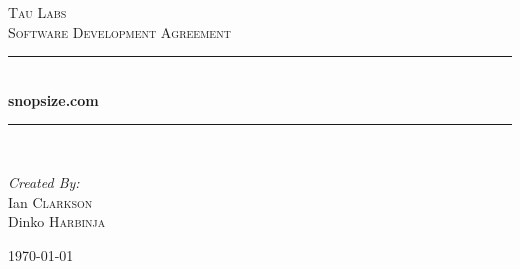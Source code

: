 \begin{titlepage}

\newcommand{\HRule}{\rule{\linewidth}{0.5mm}}

\begin{center}


\textsc{\LARGE Tau Labs}\\[1.5cm]

\textsc{\Large Software Development Agreement}\\[1.5cm]

\HRule \\[0.4cm]
{ \huge \bf snopsize.com}\\[0.4cm]
\HRule \\[1.5cm]

\begin{minipage}{0.4\textwidth}
\begin{flushleft} \large
\emph{Created By:}\\
Ian \textsc{Clarkson} \\
Dinko \textsc{Harbinja} 
\end{flushleft}
\end{minipage}

\vfill

{\large \today}

\end{center}

\end{titlepage}